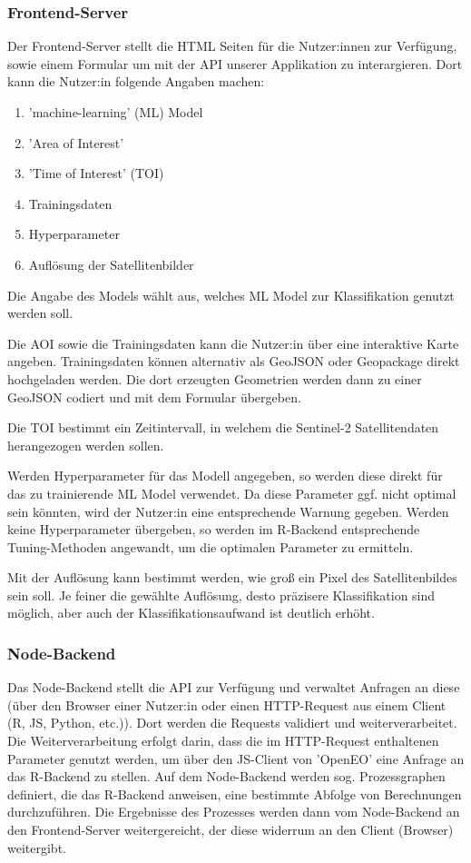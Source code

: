 \documentclass[a4paper,12pt]{article}
\begin{document}
\subsubsection{Frontend-Server}
Der Frontend-Server stellt die HTML Seiten für die Nutzer:innen zur Verfügung, sowie einem Formular um mit der API unserer Applikation zu interargieren. Dort kann die Nutzer:in folgende Angaben machen:
\begin{multicols}{2}
\begin{enumerate}
    \item 'machine-learning' (ML) Model
    \item 'Area of Interest' 
    \item 'Time of Interest' (TOI)
    \item Trainingsdaten
    \item Hyperparameter
    \item Auflösung der Satellitenbilder
\end{enumerate}
\end{multicols}

Die Angabe des Models wählt aus, welches ML Model zur Klassifikation genutzt werden soll.
\par

Die AOI sowie die Trainingsdaten kann die Nutzer:in über eine interaktive Karte angeben. Trainingsdaten können alternativ als GeoJSON oder Geopackage direkt hochgeladen werden. Die dort erzeugten Geometrien werden dann zu einer GeoJSON codiert und mit dem Formular übergeben. 
\par
Die TOI bestimmt ein Zeitintervall, in welchem die Sentinel-2 Satellitendaten herangezogen werden sollen.
\par
Werden Hyperparameter für das Modell angegeben, so werden diese direkt für das zu trainierende ML Model verwendet. Da diese Parameter ggf. nicht optimal sein könnten, wird der Nutzer:in eine entsprechende Warnung gegeben. Werden keine Hyperparameter übergeben, so werden im R-Backend entsprechende Tuning-Methoden angewandt, um die optimalen Parameter zu ermitteln.
\par
Mit der Auflösung kann bestimmt werden, wie groß ein Pixel des Satellitenbildes sein soll. Je feiner die gewählte Auflösung, desto präzisere Klassifikation sind möglich, aber auch der Klassifikationsaufwand ist deutlich erhöht.

\subsubsection{Node-Backend}
Das Node-Backend stellt die API zur Verfügung und verwaltet Anfragen an diese (über den Browser einer Nutzer:in oder einen HTTP-Request aus einem Client (R, JS, Python, etc.)). Dort werden die Requests validiert und weiterverarbeitet. Die Weiterverarbeitung erfolgt darin, dass die im HTTP-Request enthaltenen Parameter genutzt werden, um über den JS-Client von 'OpenEO' eine Anfrage an das R-Backend zu stellen. Auf dem Node-Backend werden sog. Prozessgraphen definiert, die das R-Backend anweisen, eine bestimmte Abfolge von Berechnungen durchzuführen. Die Ergebnisse des Prozesses werden dann vom Node-Backend an den Frontend-Server weitergereicht, der diese widerrum an den Client (Browser) weitergibt.
\end{document}

